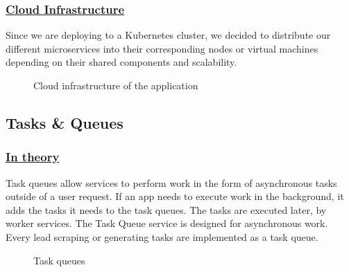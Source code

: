 \subsubsection*{\underline{Cloud Infrastructure}}
Since we are deploying to a Kubernetes cluster, we decided to distribute our different microservices into their corresponding nodes or virtual machines depending on their shared components and scalability.
\begin{figure}[H]
	\centering
	\caption{Cloud infrastructure of the application}
	\label{fig:cloud-infrastructure}
\end{figure}

\subsection{Tasks \& Queues}

\subsubsection*{\underline{In theory}}
Task queues allow services to perform work in the form of asynchronous tasks outside of a user request.
If an app needs to execute work in the background, it adds the tasks it needs to the task queues. The tasks are executed later, by worker services. The Task Queue service is designed for asynchronous work.
Every lead scraping or generating tasks are implemented as a task queue.
\begin{figure}[H]
	\centering
	\caption{Task queues}
	\label{fig:task-queue}
\end{figure}

